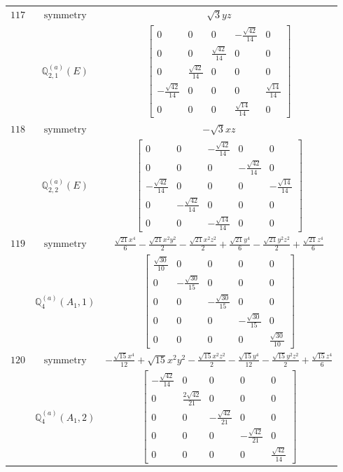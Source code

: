 \documentclass[fleqn,8pt,landscape]{jsarticle}
\begin{document}
\begin{longtable}{ccc}
$ 117 $ & $ \text{symmetry} $ & $ \sqrt{3} y z $ \\
$  $ & $ \mathbb{Q}_{2,1}^{(a)}(E) $ & $ \begin{bmatrix} 0 & 0 & 0 & - \frac{\sqrt{42}}{14} & 0 \\ 0 & 0 & \frac{\sqrt{42}}{14} & 0 & 0 \\ 0 & \frac{\sqrt{42}}{14} & 0 & 0 & 0 \\ - \frac{\sqrt{42}}{14} & 0 & 0 & 0 & \frac{\sqrt{14}}{14} \\ 0 & 0 & 0 & \frac{\sqrt{14}}{14} & 0 \end{bmatrix} $ \\ \hline
$ 118 $ & $ \text{symmetry} $ & $ - \sqrt{3} x z $ \\
$  $ & $ \mathbb{Q}_{2,2}^{(a)}(E) $ & $ \begin{bmatrix} 0 & 0 & - \frac{\sqrt{42}}{14} & 0 & 0 \\ 0 & 0 & 0 & - \frac{\sqrt{42}}{14} & 0 \\ - \frac{\sqrt{42}}{14} & 0 & 0 & 0 & - \frac{\sqrt{14}}{14} \\ 0 & - \frac{\sqrt{42}}{14} & 0 & 0 & 0 \\ 0 & 0 & - \frac{\sqrt{14}}{14} & 0 & 0 \end{bmatrix} $ \\ \hline
$ 119 $ & $ \text{symmetry} $ & $ \frac{\sqrt{21} x^{4}}{6} - \frac{\sqrt{21} x^{2} y^{2}}{2} - \frac{\sqrt{21} x^{2} z^{2}}{2} + \frac{\sqrt{21} y^{4}}{6} - \frac{\sqrt{21} y^{2} z^{2}}{2} + \frac{\sqrt{21} z^{4}}{6} $ \\
$  $ & $ \mathbb{Q}_{4}^{(a)}(A_{1},1) $ & $ \begin{bmatrix} \frac{\sqrt{30}}{10} & 0 & 0 & 0 & 0 \\ 0 & - \frac{\sqrt{30}}{15} & 0 & 0 & 0 \\ 0 & 0 & - \frac{\sqrt{30}}{15} & 0 & 0 \\ 0 & 0 & 0 & - \frac{\sqrt{30}}{15} & 0 \\ 0 & 0 & 0 & 0 & \frac{\sqrt{30}}{10} \end{bmatrix} $ \\ \hline
$ 120 $ & $ \text{symmetry} $ & $ - \frac{\sqrt{15} x^{4}}{12} + \sqrt{15} x^{2} y^{2} - \frac{\sqrt{15} x^{2} z^{2}}{2} - \frac{\sqrt{15} y^{4}}{12} - \frac{\sqrt{15} y^{2} z^{2}}{2} + \frac{\sqrt{15} z^{4}}{6} $ \\
$  $ & $ \mathbb{Q}_{4}^{(a)}(A_{1},2) $ & $ \begin{bmatrix} - \frac{\sqrt{42}}{14} & 0 & 0 & 0 & 0 \\ 0 & \frac{2 \sqrt{42}}{21} & 0 & 0 & 0 \\ 0 & 0 & - \frac{\sqrt{42}}{21} & 0 & 0 \\ 0 & 0 & 0 & - \frac{\sqrt{42}}{21} & 0 \\ 0 & 0 & 0 & 0 & \frac{\sqrt{42}}{14} \end{bmatrix} $ \\ \hline

\end{longtable}
\end{document}
